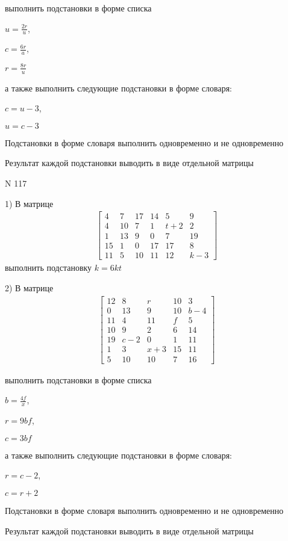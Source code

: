 \documentclass[11pt]{report}
\begin{document}
выполнить подстановки в форме списка

$u=\frac{2 r}{u}$,

$c=\frac{6 r}{a}$,

$r=\frac{8 r}{u}$

а также выполнить следующие подстановки в форме словаря:

$c=u - 3$,

$u=c - 3$


    Подстановки в форме словаря выполнить одновременно и не одновременно


    Результат каждой подстановки выводить в виде отдельной матрицы

\newpage
N 117


    1) В матрице
\begin{align*}
\left[\begin{matrix}4 & 7 & 17 & 14 & 5 & 9\\4 & 10 & 7 & 1 & t + 2 & 2\\1 & 13 & 9 & 0 & 7 & 19\\15 & 1 & 0 & 17 & 17 & 8\\11 & 5 & 10 & 11 & 12 & k - 3\end{matrix}\right]
\end{align*}
выполнить подстановку $k=6 k t$


    2) В матрице
\begin{align*}
\left[\begin{matrix}12 & 8 & r & 10 & 3\\0 & 13 & 9 & 10 & b - 4\\11 & 4 & 11 & f & 5\\10 & 9 & 2 & 6 & 14\\19 & c - 2 & 0 & 1 & 11\\1 & 3 & x + 3 & 15 & 11\\5 & 10 & 10 & 7 & 16\end{matrix}\right]
\end{align*}

выполнить подстановки в форме списка

$b=\frac{4 f}{x}$,

$r=9 b f$,

$c=3 b f$

а также выполнить следующие подстановки в форме словаря:

$r=c - 2$,

$c=r + 2$


    Подстановки в форме словаря выполнить одновременно и не одновременно


    Результат каждой подстановки выводить в виде отдельной матрицы
\end{document}
